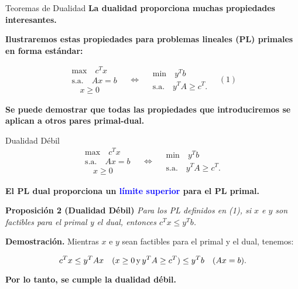 \documentclass{beamer}
\begin{document}
\begin{frame}{Teoremas de Dualidad}
    \textbf{La dualidad proporciona muchas propiedades interesantes.}

    \vspace{0.3cm}
    \textbf{Ilustraremos estas propiedades para problemas lineales (PL) primales en \textbf{forma estándar}:}
    
    \vspace{0.5cm}
    \[
    \begin{array}{c}
    \text{max} \quad c^T x \\
    \text{s.a.} \quad Ax = b \\
    \quad x \geq 0
    \end{array}
    \quad \Leftrightarrow \quad
    \begin{array}{c}
    \text{min} \quad y^T b \\
    \text{s.a.} \quad y^T A \geq c^T.
    \end{array}
    \quad (1)
    \]

    \vspace{0.5cm}
    \textbf{Se puede demostrar que todas las propiedades que introduciremos se aplican a otros pares primal-dual.}
\end{frame}

\begin{frame}{Dualidad Débil}
    \[
    \begin{array}{c}
    \text{max} \quad c^T x \\
    \text{s.a.} \quad Ax = b \\
    \quad x \geq 0
    \end{array}
    \quad \Leftrightarrow \quad
    \begin{array}{c}
    \text{min} \quad y^T b \\
    \text{s.a.} \quad y^T A \geq c^T.
    \end{array}
    \]

    \vspace{0.3cm}
    \textbf{El PL dual proporciona un \textcolor{blue}{límite superior} para el PL primal.}

    \vspace{0.5cm}
    \begin{block}{\textbf{Proposición 2 (Dualidad Débil)}}
        \textit{Para los PL definidos en (1), si \( x \) e \( y \) son factibles para el primal y el dual, entonces \( c^T x \leq y^T b \).}
    \end{block}

    \vspace{0.3cm}
    \textbf{Demostración.} Mientras \( x \) e \( y \) sean factibles para el primal y el dual, tenemos:

    \[
    c^T x \leq y^T A x \quad (x \geq 0 \, \text{y} \, y^T A \geq c^T) \\
    \leq y^T b \quad (Ax = b).
    \]

    \vspace{0.3cm}
    \textbf{Por lo tanto, se cumple la dualidad débil.}
\end{frame}
\end{document}
